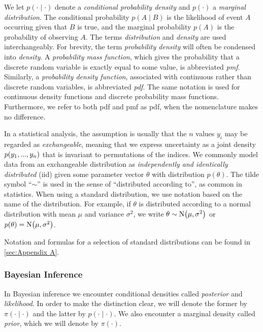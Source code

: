 We let $p(\cdot \mid \cdot)$ denote a \textit{conditional probability density} and $p(\cdot)$ a \textit{marginal distribution}. The conditional probability $p(A \mid B)$ is the likelihood of event $A$ occurring given that $B$ is true, and the marginal probability $p(A)$ is the probability of observing $A$. The terms \textit{distribution} and \textit{density} are used interchangeably. For brevity, the term \textit{probability density} will often be condensed into \textit{density}. A \textit{probability mass function}, which gives the probability that a discrete random variable is exactly equal to some value, is abbreviated \textit{pmf}. Similarly, a \textit{probability density function}, associated with continuous rather than discrete random variables, is abbreviated \textit{pdf}. The same notation is used for continuous density functions and discrete probability mass functions. Furthermore, we refer to both pdf and pmf as pdf, when the nomenclature makes no difference. 

In a statistical analysis, the assumption is usually that the $n$ values $y_i$ may be regarded as \textit{exchangeable}, meaning that we express uncertainty as a joint density $p \qty(y_1, ..., y_n)$ that is invariant to permutations of the indices. We commonly model data from an exchangeable distribution as \textit{independently and identically distributed} (iid) given some parameter vector $\theta$ with distribution $p(\theta)$. The tilde symbol “$\sim$” is used in the sense of “distributed according to”, as common in statistics. When using a standard distribution, we use notation based on the name of the distribution. For example, if $\theta$ is distributed according to a normal distribution with mean $\mu$ and variance $\sigma^2$, we write $\theta \sim \mathrm{N} \qty(\mu, \sigma^2)$ or $p(\theta) = \mathrm{N}\qty(\mu, \sigma^2)$. 


Notation and formulas for a selection of standard distributions can be found in \autoref{sec:Appendix A}.

\subsubsection{Bayesian Inference}

In Bayesian inference we encounter conditional densities called \textit{posterior} and \textit{likelihood}. In order to make the distinction clear, we will denote the former by $\pi(\cdot \mid \cdot)$ and the latter by $p(\cdot \mid \cdot)$. We also encounter a marginal density called \textit{prior}, which we will denote by $\pi(\cdot)$.  